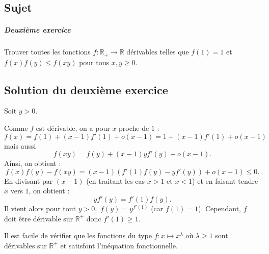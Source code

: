 \chapter{}

\section{Sujet}

\paragraph{Deuxième exercice}

Trouver toutes les fonctions $f : \mathbb R_+ \to \mathbb R$ dérivables telles que $f(1)=1$ et $f(x)f(y) \leq f(xy)$ pour tous $x,y \geqslant 0$.


\section{Solution du deuxième exercice} %

Soit $y>0.$

Comme $f$ est dérivable, on a pour $x$ proche de $1$ : 
$$f(x)=f(1)+(x-1)f'(1)+o(x-1)=1+(x-1)f'(1)+o(x-1)$$ mais aussi $$ f(xy)=f(y)+(x-1)yf'(y)+o(x-1).$$
Ainsi, on obtient : $$f(x)f(y)-f(xy)=(x-1)\left( f'(1)f(y)-yf'(y) \right)+o(x-1)\leq 0.$$
En divisant par $(x-1)$ (en traitant les cas $x>1$ et $x<1$) et en faisant tendre $x$ vers $1$, on obtient : $$yf'(y)=f'(1)f(y).$$
Il vient alors pour tout $y>0,$ $\displaystyle f(y)=y^{f'(1)}$ (car $f(1)=1$).
Cependant, $f$ doit être dérivable sur $\mathbb{R}^{+}$ donc $f'(1)\geq 1.$

Il est facile de vérifier que les fonctions du type $ f: x\mapsto x^{\lambda}$ où $\lambda\geq 1$ sont dérivables sur $\mathbb{R}^{+}$ et satisfont l'inéquation fonctionnelle.